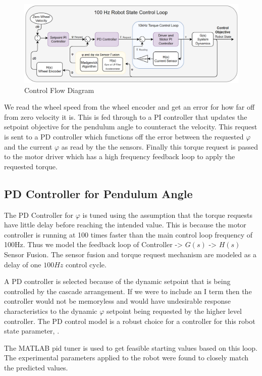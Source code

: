 \documentclass[11pt]{article}
\begin{document}
\begin{figure}[H]
\centering
\includegraphics[width=1.05\textwidth]{PIDcontroller.drawio.png} 
\caption{Control Flow Diagram}
\label{fig:pendulum}
\end{figure}

We read the wheel speed from the wheel encoder and get an error for how far off from zero velocity it is. This is fed through to a PI controller that updates the setpoint objective for the pendulum angle to counteract the velocity. This request is sent to a PD controller which functions off the error between the requested $\varphi$ and the current $\varphi$ as read by the the sensors. Finally this torque request is passed to the motor driver which has a high frequency feedback loop to apply the requested torque.

\subsection{PD Controller for Pendulum Angle}

The PD Controller for $\varphi$ is tuned using the assumption that the torque requests have little delay before reaching the intended value. This is because the motor controller is running at 100 times faster than the main control loop frequency of 100Hz. Thus we model the feedback loop of Controller -> $G(s)$ -> $H(s)$ Sensor Fusion. The sensor fusion and torque request mechanism are modeled as a delay of one $100Hz$ control cycle.

A PD controller is selected because of the dynamic setpoint that is being controlled by the cascade arrangement. If we were to include an I term then the controller would not be memoryless and would have undesirable response characteristics to the dynamic $\varphi$ setpoint being requested by the higher level controller. The PD control model is a robust choice for a controller for this robot state parameter, \cite{Brevik2017}.

The MATLAB pid tuner is used to get feasible starting values based on this loop. The experimental parameters applied to the robot were found to closely match the predicted values.
\end{document}
